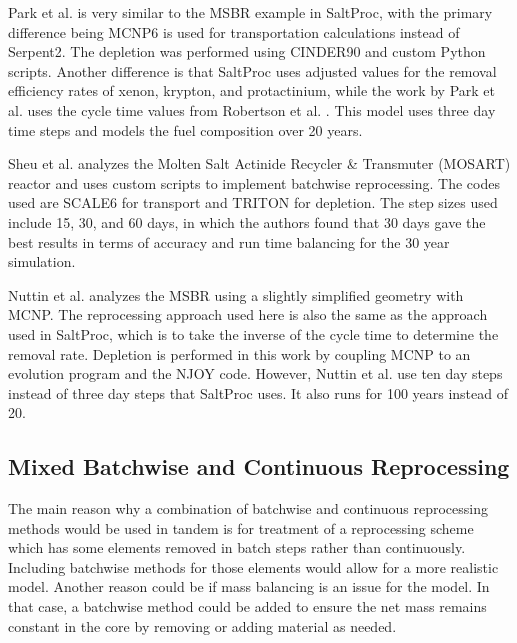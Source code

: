 Park et al. \cite{park_whole_2015} is very similar to the MSBR example in SaltProc, with the primary difference being MCNP6 is used for transportation calculations instead of Serpent2. The depletion was performed using CINDER90 and custom Python scripts. Another difference is that SaltProc uses adjusted values for the removal efficiency rates of xenon, krypton, and protactinium, while the work by Park et al. uses the cycle time values from Robertson et al. \cite{robertson_conceptual_1971}. This model uses three day time steps and models the fuel composition over 20 years.

Sheu et al. \cite{sheu_depletion_2013} analyzes the Molten Salt Actinide Recycler \& Transmuter (MOSART) reactor and uses custom scripts to implement batchwise reprocessing. The codes used are SCALE6 for transport and TRITON for depletion. The step sizes used include 15, 30, and 60 days, in which the authors found that 30 days gave the best results in terms of accuracy and run time balancing for the 30 year simulation.

Nuttin et al. \cite{nuttin_potential_2005} analyzes the MSBR using a slightly simplified geometry with MCNP. The reprocessing approach used here is also the same as the approach used in SaltProc, which is to take the inverse of the cycle time to determine the removal rate. Depletion is performed in this work by coupling MCNP to an evolution program and the NJOY code. However, Nuttin et al. use ten day steps instead of three day steps that SaltProc uses. It also runs for 100 years instead of 20.

\subsection{Mixed Batchwise and Continuous Reprocessing}
\label{litrev-msr-mixed}

The main reason why a combination of batchwise and continuous reprocessing methods would be used in tandem is for treatment of a reprocessing scheme which has some elements removed in batch steps rather than continuously. Including batchwise methods for those elements would allow for a more realistic model. Another reason could be if mass balancing is an issue for the model. In that case, a batchwise method could be added to ensure the net mass remains constant in the core by removing or adding material as needed.

